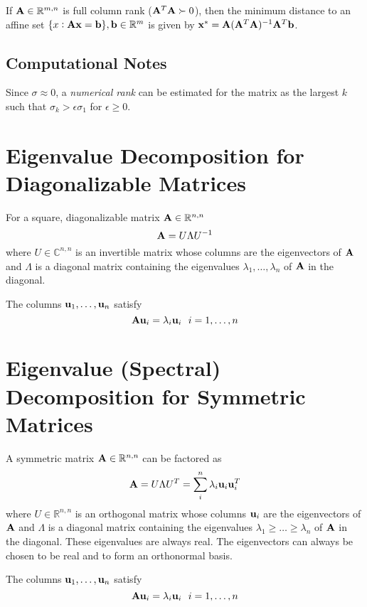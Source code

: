 If $\mathbf{A}\in\mathbb{R}^{m,n}$ is full column rank ($\mathbf{A}^T\mathbf{A}\succ0$), then the minimum distance to an affine set $\{x:\mathbf{A}\mathbf{x}=\mathbf{b}\}, \mathbf{b}\in\mathbb{R}^{m}$ is given by $\mathbf{x}^*=\mathbf{A}(\mathbf{A}^T\mathbf{A})^{-1}\mathbf{A}^T\mathbf{b}$. %


\subsection*{Computational Notes}
Since $\sigma\approx0$, a \textit{numerical rank} can be estimated for the matrix as the largest $k$ such that $\sigma_k>\epsilon \sigma_1$ for $\epsilon\ge0$.



\section{Eigenvalue Decomposition for Diagonalizable Matrices}

For a square, diagonalizable matrix $\mathbf{A}\in\mathbb{R}^{n,n}$ 
\begin{equation}
\mathbf{A}=U\Lambda U^{-1}
\end{equation}
where $U\in\mathbb{C}^{n,n}$ is an invertible matrix whose columns are the eigenvectors of $\mathbf{A}$ and $\Lambda$ is a diagonal matrix containing the eigenvalues $\lambda_1,\ldots,\lambda_n$ of $\mathbf{A}$ in the diagonal.

The columns $\mathbf{u}_1,\ldots,\mathbf{u}_n$ satisfy
\begin{equation}
\mathbf{A} \mathbf{u}_i=\lambda_i \mathbf{u}_i~~i=1,\ldots,n
\end{equation}

\section{Eigenvalue (Spectral) Decomposition for Symmetric Matrices}

A symmetric matrix $\mathbf{A}\in\mathbb{R}^{n,n}$ can be factored as
\begin{equation}
\mathbf{A}=U\Lambda U^T=\sum_i^n \lambda_i \mathbf{u}_i \mathbf{u}_i^T
\end{equation}
where $U\in\mathbb{R}^{n,n}$ is an orthogonal matrix whose columns $\mathbf{u}_i$ are the eigenvectors of $\mathbf{A}$ and $\Lambda$ is a diagonal matrix containing the eigenvalues $\lambda_1\ge\ldots\ge\lambda_n$ of $\mathbf{A}$ in the diagonal. These eigenvalues are always real. The eigenvectors can always be chosen to be real and to form an orthonormal basis.

The columns $\mathbf{u}_1,\ldots,\mathbf{u}_n$ satisfy
\begin{equation}
\mathbf{A} \mathbf{u}_i=\lambda_i \mathbf{u}_i~~i=1,\ldots,n
\end{equation}


